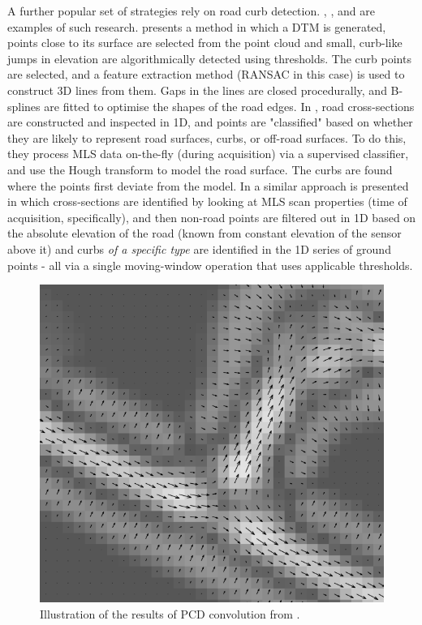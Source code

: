 A further popular set of strategies rely on road curb detection. \cite{vosselman_zhou_2009}, \cite{zhang_2010}, and \cite{yang_etal_2013} are examples of such research. \cite{vosselman_zhou_2009} presents a method in which a DTM is generated, points close to its surface are selected from the point cloud and small, curb-like jumps in elevation are algorithmically detected using thresholds. The curb points are selected, and a feature extraction method (RANSAC in this case) is used to construct 3D lines from them. Gaps in the lines are closed procedurally, and B-splines are fitted to optimise the shapes of the road edges. In \cite{zhang_2010}, road cross-sections are constructed and inspected in 1D, and points are "classified" based on whether they are likely to represent road surfaces, curbs, or off-road surfaces. To do this, they process MLS data on-the-fly (during acquisition) via a supervised classifier, and use the Hough transform to model the road surface. The curbs are found where the points first deviate from the model. In \cite{yang_etal_2013} a similar approach is presented in which cross-sections are identified by looking at MLS scan properties (time of acquisition, specifically), and then non-road points are filtered out in 1D based on the absolute elevation of the road (known from constant elevation of the sensor above it) and curbs \textit{of a specific type} are identified in the 1D series of ground points - all via a single moving-window operation that uses applicable thresholds.

\begin{figure}
    \includegraphics[width=\linewidth]{final_report/figs/clode_etal_2007_01.png} 
    \caption{Illustration of the results of PCD convolution from \cite{clode_etal_2007}.}
    \label{fig:phasecodeddisk}
\end{figure}

